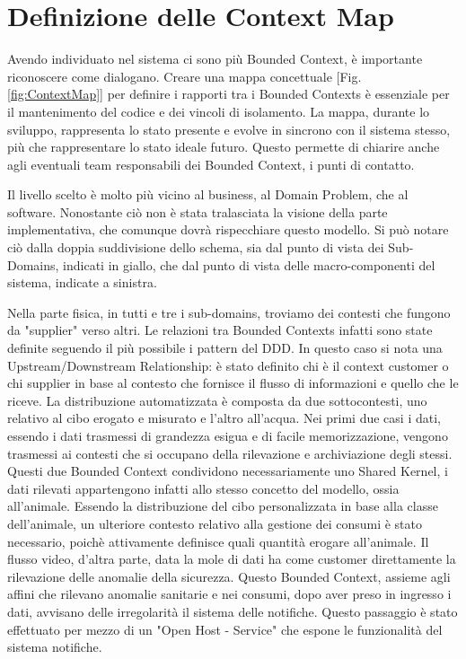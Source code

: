     \section{Definizione delle Context Map}
    Avendo individuato nel sistema ci sono più Bounded Context, è importante riconoscere come dialogano. Creare una mappa concettuale [Fig. \ref{fig:ContextMap}] per definire i rapporti tra i Bounded Contexts è essenziale per il mantenimento del codice e dei vincoli di isolamento. La mappa, durante lo sviluppo, rappresenta lo stato presente e evolve in sincrono con il sistema stesso, più che rappresentare lo stato ideale futuro. Questo permette di chiarire anche agli eventuali team responsabili dei Bounded Context, i punti di contatto.
    
    Il livello scelto è molto più vicino al business, al Domain Problem, che al software. Nonostante ciò non è stata tralasciata la visione della parte implementativa, che comunque dovrà rispecchiare questo modello. Si può notare ciò dalla doppia suddivisione dello schema, sia dal punto di vista dei Sub-Domains, indicati in giallo, che dal punto di vista delle macro-componenti del sistema, indicate a sinistra. 
    
    Nella parte fisica, in tutti e tre i sub-domains, troviamo dei contesti che fungono da "supplier" verso altri. Le relazioni tra Bounded Contexts infatti sono state definite seguendo il più possibile i pattern del DDD. In questo caso si nota una Upstream/Downstream Relationship: è stato definito chi è il context customer o chi supplier in base al contesto che fornisce il flusso di informazioni e quello che le riceve. 
    La distribuzione automatizzata è composta da due sottocontesti, uno relativo al cibo erogato e misurato e l'altro all'acqua.
    Nei primi due casi i dati, essendo i dati trasmessi di grandezza esigua e di facile memorizzazione, vengono trasmessi ai contesti che si occupano della rilevazione e archiviazione degli stessi. Questi due Bounded Context condividono necessariamente uno Shared Kernel, i dati rilevati appartengono infatti allo stesso concetto del modello, ossia all'animale. 
    Essendo la distribuzione del cibo personalizzata in base alla classe dell'animale, un ulteriore contesto relativo alla gestione dei consumi è stato necessario, poichè attivamente definisce quali quantità erogare all'animale.
    Il flusso video, d'altra parte, data la mole di dati ha come customer direttamente la rilevazione delle anomalie della sicurezza. Questo Bounded Context, assieme agli affini che rilevano anomalie sanitarie e nei consumi, dopo aver preso in ingresso i dati, avvisano delle irregolarità il sistema delle notifiche. Questo passaggio è stato effettuato per mezzo di un "Open Host - Service" che espone le funzionalità del sistema notifiche.

